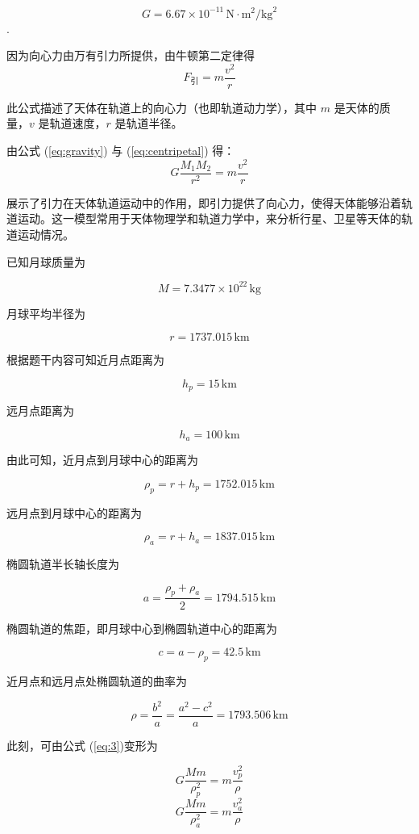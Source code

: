 \documentclass{ctexart}
\begin{document}
\[
G = 6.67 \times 10^{-11} \, \text{N} \cdot \text{m}^2 / \text{kg}^2
\].


因为向心力由万有引力所提供，由牛顿第二定律得
\begin{equation}
F_{\text{引}} = m \frac{v^2}{r}
\label{eq:centripetal}
\end{equation}

此公式描述了天体在轨道上的向心力（也即轨道动力学），其中 \( m \) 是天体的质量，\( v \) 是轨道速度，\( r \) 是轨道半径。

由公式 (\ref{eq:gravity}) 与 (\ref{eq:centripetal}) 得：
\begin{equation}
G \frac{M_1 M_2}{r^2} = m \frac{v^2}{r}
\label{eq:3}
\end{equation}

展示了引力在天体轨道运动中的作用，即引力提供了向心力，使得天体能够沿着轨道运动。这一模型常用于天体物理学和轨道力学中，来分析行星、卫星等天体的轨道运动情况。

已知月球质量为

\[M = 7.3477 \times 10^{22} \, \text{kg}\]


月球平均半径为

\[r = 1737.015 \, \text{km}\]


根据题干内容可知近月点距离为

\[h_p = 15 \, \text{km}\]

远月点距离为

\[h_a = 100 \, \text{km}\]

由此可知，近月点到月球中心的距离为

\[\rho_p = r + h_p = 1752.015 \, \text{km}\]

远月点到月球中心的距离为

\[\rho_a = r + h_a = 1837.015 \, \text{km}\]

椭圆轨道半长轴长度为

\[a = \frac{\rho_p + \rho_a}{2} = 1794.515 \, \text{km}\]


椭圆轨道的焦距，即月球中心到椭圆轨道中心的距离为

\[c = a - \rho_p = 42.5 \, \text{km}\]

近月点和远月点处椭圆轨道的曲率为

\[\rho = \frac{b^2}{a} = \frac{a^2 - c^2}{a} = 1793.506 \, \text{km}\]

此刻，可由公式 (\ref{eq:3})变形为

\[G \frac{M m}{\rho_p^2} = m \frac{v_p^2}{\rho}\]
\[G \frac{M m}{\rho_a^2} = m \frac{v_a^2}{\rho}\]
\end{document}
